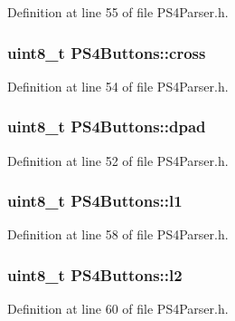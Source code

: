 \-Definition at line 55 of file \-P\-S4\-Parser.\-h.

\hypertarget{union_p_s4_buttons_a1163dc3517b1c27093b7cdd597eaa9fd}{
\subsubsection[{cross}]{\setlength{\rightskip}{0pt plus 5cm}uint8\-\_\-t {\bf \-P\-S4\-Buttons\-::cross}}}\label{union_p_s4_buttons_a1163dc3517b1c27093b7cdd597eaa9fd}


\-Definition at line 54 of file \-P\-S4\-Parser.\-h.

\hypertarget{union_p_s4_buttons_a99e2971b4e511a8d1bb718408f559a92}{
\subsubsection[{dpad}]{\setlength{\rightskip}{0pt plus 5cm}uint8\-\_\-t {\bf \-P\-S4\-Buttons\-::dpad}}}\label{union_p_s4_buttons_a99e2971b4e511a8d1bb718408f559a92}


\-Definition at line 52 of file \-P\-S4\-Parser.\-h.

\hypertarget{union_p_s4_buttons_a3488f850c1de8d49a9dc932f1575e5e4}{
\subsubsection[{l1}]{\setlength{\rightskip}{0pt plus 5cm}uint8\-\_\-t {\bf \-P\-S4\-Buttons\-::l1}}}\label{union_p_s4_buttons_a3488f850c1de8d49a9dc932f1575e5e4}


\-Definition at line 58 of file \-P\-S4\-Parser.\-h.

\hypertarget{union_p_s4_buttons_a99b88dcb511243ea0c046cac1f5633ec}{
\subsubsection[{l2}]{\setlength{\rightskip}{0pt plus 5cm}uint8\-\_\-t {\bf \-P\-S4\-Buttons\-::l2}}}\label{union_p_s4_buttons_a99b88dcb511243ea0c046cac1f5633ec}


\-Definition at line 60 of file \-P\-S4\-Parser.\-h.

